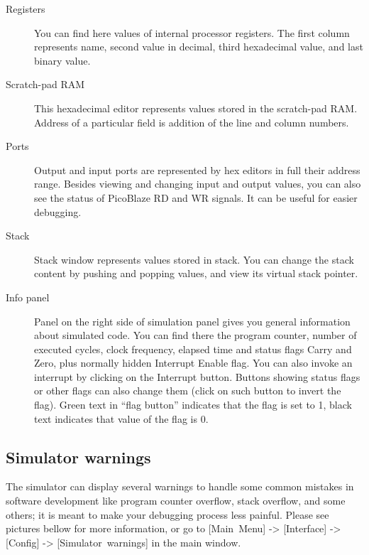     \begin{description}
        \item [Registers]
            You can find here values of internal processor registers. The first column represents name, second value in decimal, third hexadecimal value, and last binary value.
        \item [Scratch-pad RAM]
            This hexadecimal editor represents values stored in the scratch-pad RAM. Address of a particular field is addition of the line and column numbers.
        \item [Ports]
            Output and input ports are represented by hex editors in full their address range. Besides viewing and changing input and output values, you can also see the status of PicoBlaze RD and WR signals. It can be useful for easier debugging.
        \item [Stack]
            Stack window represents values stored in stack. You can change the stack content by pushing and popping values, and view its virtual stack pointer.
        \item [Info panel]
            Panel on the right side of simulation panel gives you general information about simulated code. You can find there the program counter, number of executed cycles, clock frequency, elapsed time and status flags Carry and Zero, plus normally hidden Interrupt Enable flag. You can also invoke an interrupt by clicking on the Interrupt button. Buttons showing status flags or other flags can also change them (click on such button to invert the flag). Green text in ``flag button'' indicates that the flag is set to 1, black text indicates that value of the flag is 0.
    \end{description}

    \subsection{Simulator warnings}
        The simulator can display several warnings to handle some common mistakes in software development like program counter overflow, stack overflow, and some others; it is meant to make your debugging process less painful. Please see pictures bellow for more information, or go to [Main~Menu] -> [Interface] -> [Config] -> [Simulator~warnings] in the main window.

